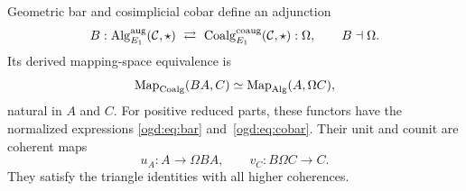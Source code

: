 \begin{proposition}\label{ogd:prop:enhanced-bar}
Geometric bar and cosimplicial cobar define an adjunction
\[
 B:\operatorname{Alg}_{E_1}^{\mathrm{aug}}(\mathcal C,\star)
 \ \rightleftarrows\
 \operatorname{Coalg}_{E_1}^{\mathrm{coaug}}(\mathcal C,\star):\Omega,
 \qquad B\dashv\Omega.
\]
Its derived mapping-space equivalence is
\begin{equation}\label{ogd:eq:forward-adjunction}
 \operatorname{Map}_{\operatorname{Coalg}}(BA,C)
 \simeq\operatorname{Map}_{\operatorname{Alg}}(A,\Omega C),
\end{equation}
natural in $A$ and $C$.
For positive reduced parts, these functors have the normalized expressions
\eqref{ogd:eq:bar} and~\eqref{ogd:eq:cobar}.
Their unit and counit are coherent maps
\[
 u_A:A\longrightarrow\Omega BA,
 \qquad v_C:B\Omega C\longrightarrow C.
\]
They satisfy the triangle identities with all higher coherences.
\end{proposition}
